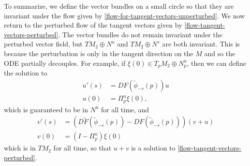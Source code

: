 To summarize, we define the vector bundles on a small circle so that they are invariant under the flow given by \cref{flow-for-tangent-vectors-unperturbed}. We now return to the perturbed flow of the tangent vectors given by \cref{flow-tangent-vectors-perturbed}. The vector bundles do not remain invariant under the perturbed vector field, but \(TM_2 \oplus N^u\) and \(TM_2 \oplus N^s\) are both invariant. This is because the perturbation is only in the tangent direction on the \(M\) and so the ODE partially decouples. For example, if \(\xi(0) \in T_pM_2 \oplus N^u_p\), then we can define the solution to 
\begin{equation}
\begin{aligned}
	u'(s) &= DF(\tilde \phi_{-s}(p)) u\\
	u(0) &= \Pi^u_p \xi(0),
\end{aligned}
\end{equation}
which is guaranteed to be in \(N^u\) for all time, and 
\begin{equation}
\begin{aligned}
	v'(s) &= (D\tilde F(\tilde\phi_{-s}(p)) - DF(\tilde\phi_{-s}(p))) (v + u) \\
	v(0) &= (I - \Pi^u_p) \xi(0)
\end{aligned}
\end{equation}
which is in \(TM_2\) for all time, so that \(u + v\) is a solution to \cref{flow-tangent-vectors-perturbed}.